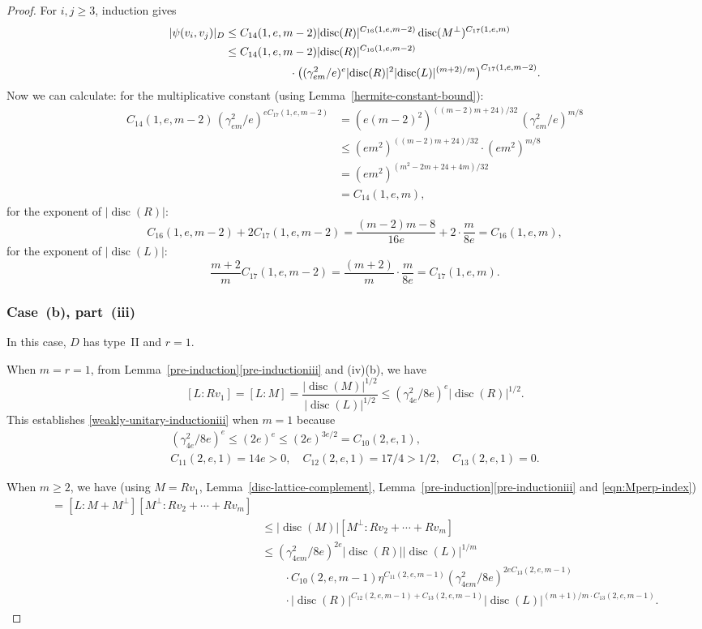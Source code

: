 \documentclass[JEP,XML,SOM,Unicode,NoFloatCountersInSection]{cedram}
\DeclareMathOperator{\disc}{disc}
\newcommand{\abs}[1]{\lvert #1 \rvert}
\begin{document}
\begin{proof}
For $i, j \geq 3$, induction gives
\begin{align*}
\abs{\psi(v_i, v_j)}_D
& \leq C_{14}(1,e,m-2) \abs{\disc(R)}^{C_{16}(1,e,m-2)} \disc(M^\perp)^{C_{17}(1,e,m)}
\\& \leq C_{14}(1,e,m-2) \abs{\disc(R)}^{C_{16}(1,e,m-2)}
\\& \hspace*{2cm} \cdot \bigl( (\gamma_{em}^2/e)^{e} \abs{\disc(R)}^2 \abs{\disc(L)}^{(m+2)/m} \bigr)^{C_{17}(1,e,m-2)}.
\end{align*}
Now we can calculate:
for the multiplicative constant (using Lemma~\ref{hermite-constant-bound}):
\begin{align*}
C_{14}(1,e,m-2) \, (\gamma_{em}^2/e)^{eC_{17}(1,e,m-2)}& = (e(m-2)^2)^{((m-2)m+24)/32} \, (\gamma_{em}^2/e)^{m/8}
\\& \leq (em^2)^{((m-2)m+24)/32} \cdot (em^2)^{m/8}
\\& = (em^2)^{(m^2-2m+24 + 4m)/32}
\\& = C_{14}(1,e,m),
\end{align*}
for the exponent of $\abs{\disc(R)}$:
\[
C_{16}(1,e,m-2) + 2C_{17}(1,e,m-2) = \frac{(m-2)m-8}{16e} + 2 \cdot \frac{m}{8e}
= C_{16}(1,e,m),
\]
for the exponent of $\abs{\disc(L)}$:
\[
\frac{m+2}{m} C_{17}(1,e,m-2) = \frac{(m+2)}{m} \cdot \frac{m}{8e}
= C_{17}(1,e,m).
\]

\subsubsection*{Case~(b), part~(iii)}
In this case, $D$ has type~II and $r=1$.

When $m=r=1$, from Lemma~\ref{pre-induction}\eqref{pre-inductioniii} and (iv)(b), we have
\[
[L:Rv_1] = [L:M] = \frac{\abs{\disc(M)}^{1/2}}{\abs{\disc(L)}^{1/2}} \leq (\gamma_{4e}^2/8e)^{e} \abs{\disc(R)}^{1/2}.
\]
This establishes \eqref{weakly-unitary-inductioniii} when $m=1$ because
\begin{gather*}
(\gamma_{4e}^2/8e)^e \leq (2e)^e \leq (2e)^{3e/2} = C_{10}(2,e,1),
\\ C_{11}(2,e,1) = 14e > 0,
\quad C_{12}(2,e,1) = 17/4 > 1/2,
\quad C_{13}(2,e,1) = 0.
\end{gather*}

When $m \geq 2$, we have (using $M = Rv_1$, Lemma~\ref{disc-lattice-complement}, Lemma~\ref{pre-induction}\eqref{pre-inductioniii} and \eqref{eqn:Mperp-index})
\begin{align*}
[L : Rv_1 &+ \dotsb + Rv_m]
= [L : M + M^\perp] [M^\perp : Rv_2 + \dotsb + Rv_m]
\\& \leq \abs{\disc(M)} [M^\perp : Rv_2 + \dotsb + Rv_m]
\\& \leq (\gamma_{4em}^2/8e)^{2e} \abs{\disc(R)} \abs{\disc(L)}^{1/m}
\\& \qquad \cdot C_{10}(2,e,m-1) \eta^{C_{11}(2,e,m-1)} (\gamma_{4em}^2/8e)^{2eC_{13}(2,e,m-1)}
\\& \qquad \cdot \abs{\disc(R)}^{C_{12}(2,e,m-1) + C_{13}(2,e,m-1)} \abs{\disc(L)}^{(m+1)/m \cdot C_{13}(2,e,m-1)}.
\end{align*}


\end{proof}
\end{document}
